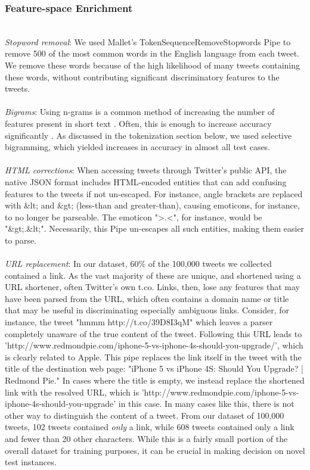 \documentclass[letterpaper]{article}
\begin{document}
\subsubsection{Feature-space Enrichment} ~\\
\textit{Stopword removal}: We used Mallet's TokenSequenceRemoveStopwords Pipe to remove 500 of the most common words in the English language from each tweet. We remove these words because of the high likelihood of many tweets containing these words, without contributing significant discriminatory features to the tweets. %
\\
~\\
\textit{Bigrams}: Using n-grams is a common method of increasing the number of features present in short text %
. Often, this is enough to increase accuracy significantly%
. As discussed in the tokenization section below, we used selective bigramming, which yielded increases in accuracy in almost all test cases.\\
~\\
\textit{HTML corrections}: When accessing tweets through Twitter's public API, the native JSON format includes HTML-encoded entities that can add confusing features to the tweets if not un-escaped. For instance, angle brackets are replaced with \&lt; and \&gt; (less-than and greater-than), causing emoticons, for instance, to no longer be parseable. The emoticon ">.<", for instance, would be "\&gt;.\&lt;". Necessarily, this Pipe un-escapes all such entities, making them easier to parse.\\
~\\
\textit{URL replacement}: In our dataset, 60\% of the 100,000 tweets we collected contained a link. As the vast majority of these are unique, and shortened using a URL shortener, often Twitter's own t.co. Links, then, lose any features that may have been parsed from the URL, which often contains a domain name or title that may be useful in discriminating especially ambiguous links. Consider, for instance, the tweet "hmmm http://t.co/39D8I3qM" which leaves a parser completely unaware of the true content of the tweet. Following this URL leads to 'http://www.redmondpie.com/iphone-5-vs-iphone-4s-should-you-upgrade/', which is clearly related to Apple. This pipe replaces the link itself in the tweet with the title of the destination web page: "iPhone 5 vs iPhone 4S: Should You Upgrade? | Redmond Pie." In cases where the title is empty, we instead replace the shortened link with the resolved URL, which is 'http://www.redmondpie.com/iphone-5-vs-iphone-4s-should-you-upgrade' in this case. In many cases like this, there is not other way to distinguish the content of a tweet. From our dataset of 100,000 tweets, 102 tweets contained \textit{only} a link, while 608 tweets contained only a link and fewer than 20 other characters. While this is a fairly small portion of the overall dataset for training purposes, it can be crucial in making decision on novel test instances.
\end{document}
